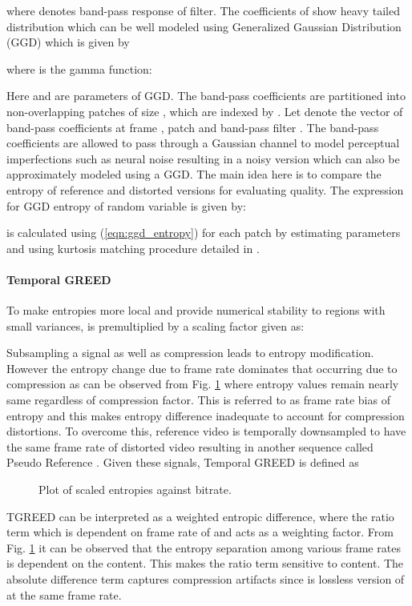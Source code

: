 \documentclass[conference]{IEEEtran}
\begin{document}
where  denotes band-pass response of  filter. The coefficients of  show heavy tailed distribution which can be well modeled using Generalized Gaussian Distribution (GGD) which is given by

where  is the gamma function:

Here  and  are parameters of GGD. The band-pass coefficients are partitioned into non-overlapping patches of size , which are indexed by . Let  denote the vector of band-pass coefficients at frame , patch  and band-pass filter . The band-pass coefficients  are allowed to pass through a Gaussian channel to model perceptual imperfections such as neural noise \cite{sheikh2006image,soundararajan2012video} resulting in a noisy version  which can also be approximately modeled using a GGD. The main idea here is to compare the entropy  of reference and distorted versions for evaluating quality. The expression for GGD entropy of random variable  is given by:

 is calculated using (\ref{eqn:ggd_entropy}) for each patch by estimating parameters  and  using kurtosis matching procedure detailed in \cite{soury2015new,pan2012exposing}.

\paragraph*{\textbf{Temporal GREED}}
To make entropies more local and provide numerical stability to regions with small variances,  is premultiplied by a scaling factor given as:

Subsampling a signal as well as compression leads to entropy modification. However the entropy change due to frame rate dominates that occurring due to compression as can be observed from Fig. \ref{fig:frame_rate_bias} where entropy values remain nearly same regardless of compression factor. This is referred to as frame rate bias of entropy and this makes entropy difference inadequate to account for compression distortions. To overcome this, reference video  is temporally downsampled to have the same frame rate of distorted video  resulting in another sequence called Pseudo Reference . Given these signals, Temporal GREED is defined as


\begin{figure}[t]
    \captionsetup[subfigure]{justification=centering}
        \centering
         \quad
        \caption{Plot of scaled entropies against bitrate.}
        \label{fig:frame_rate_bias}
\end{figure}
TGREED can be interpreted as a weighted entropic difference, where the ratio term which is dependent on frame rate of  and  acts as a weighting factor. From Fig. \ref{fig:frame_rate_bias} it can be observed that the entropy separation among various frame rates is dependent on the content. This makes the ratio term sensitive to content. The absolute difference term captures compression artifacts since  is lossless version of  at the same frame rate.
\end{document}
